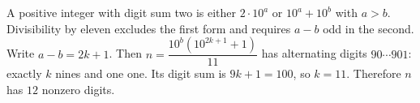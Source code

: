 A positive integer with digit sum two is either $2\cdot10^a$ or $10^a+10^b$ with $a>b$. Divisibility by eleven excludes the first form and requires $a-b$ odd in the second. Write $a-b=2k+1$. Then $n=\dfrac{10^b(10^{2k+1}+1)}{11}$ has alternating digits $90\cdots901$: exactly $k$ nines and one one. Its digit sum is $9k+1=100$, so $k=11$. Therefore $n$ has $\boxed{12}$ nonzero digits.

